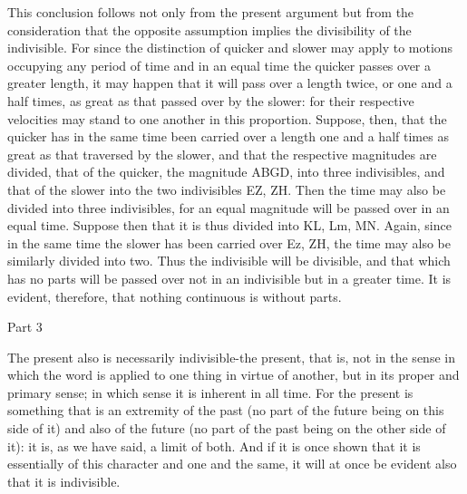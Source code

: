 This conclusion follows not only from the present argument but from
the consideration that the opposite assumption implies the divisibility
of the indivisible. For since the distinction of quicker and slower
may apply to motions occupying any period of time and in an equal
time the quicker passes over a greater length, it may happen that
it will pass over a length twice, or one and a half times, as great
as that passed over by the slower: for their respective velocities
may stand to one another in this proportion. Suppose, then, that the
quicker has in the same time been carried over a length one and a
half times as great as that traversed by the slower, and that the
respective magnitudes are divided, that of the quicker, the magnitude
ABGD, into three indivisibles, and that of the slower into the two
indivisibles EZ, ZH. Then the time may also be divided into three
indivisibles, for an equal magnitude will be passed over in an equal
time. Suppose then that it is thus divided into KL, Lm, MN. Again,
since in the same time the slower has been carried over Ez, ZH, the
time may also be similarly divided into two. Thus the indivisible
will be divisible, and that which has no parts will be passed over
not in an indivisible but in a greater time. It is evident, therefore,
that nothing continuous is without parts. 

Part 3

The present also is necessarily indivisible-the present, that is,
not in the sense in which the word is applied to one thing in virtue
of another, but in its proper and primary sense; in which sense it
is inherent in all time. For the present is something that is an extremity
of the past (no part of the future being on this side of it) and also
of the future (no part of the past being on the other side of it):
it is, as we have said, a limit of both. And if it is once shown that
it is essentially of this character and one and the same, it will
at once be evident also that it is indivisible. 

